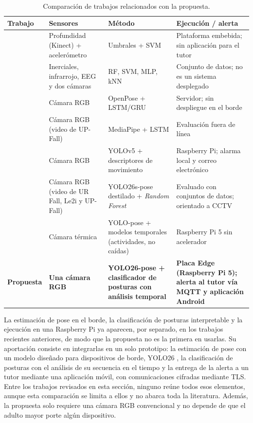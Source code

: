\documentclass[12pt,a4paper,oneside]{book}
\theoremstyle{plain}
\theoremstyle{definition}
\theoremstyle{remark}
\begin{document}
\begin{table}[htbp]
\centering
\caption{Comparación de trabajos relacionados con la propuesta.}
\label{tab:estado-arte}
\small
\begin{tabular}{L{2.6cm}L{2.8cm}L{3.0cm}L{3.4cm}}
\toprule
\textbf{Trabajo} & \textbf{Sensores} & \textbf{Método} & \textbf{Ejecución / alerta} \\
\midrule
\textcite{kwolek2014human} & Profundidad (Kinect) + acelerómetro & Umbrales + SVM & Plataforma embebida; sin aplicación para el tutor \\
\addlinespace
\textcite{martinez2019upfall} & Inerciales, infrarrojo, EEG y dos cámaras & RF, SVM, MLP, kNN & Conjunto de datos; no es un sistema desplegado \\
\addlinespace
\textcite{lin2021openpose} & Cámara RGB & OpenPose + LSTM/GRU & Servidor; sin despliegue en el borde \\
\addlinespace
\textcite{mobasheri2022fall} & Cámara RGB (video de UP-Fall) & MediaPipe + LSTM & Evaluación fuera de línea \\
\addlinespace
\textcite{giri2025yolov5pi} & Cámara RGB & YOLOv5 + descriptores de movimiento & Raspberry Pi; alarma local y correo electrónico \\
\addlinespace
\textcite{mukhtorov2026distilled} & Cámara RGB (video de UR Fall, Le2i y UP-Fall) & YOLO26s-pose destilado + \textit{Random Forest} & Evaluado con conjuntos de datos; orientado a CCTV \\
\addlinespace
\textcite{vdoviak2026thermal} & Cámara térmica & YOLO-pose + modelos temporales (actividades, no caídas) & Raspberry Pi 5 sin acelerador \\
\addlinespace
\textbf{Propuesta} & \textbf{Una cámara RGB} & \textbf{YOLO26-pose + clasificador de posturas con análisis temporal} & \textbf{Placa Edge (Raspberry Pi 5); alerta al tutor vía MQTT y aplicación Android} \\
\bottomrule
\end{tabular}
\end{table}
 
La estimación de pose en el borde, la clasificación de posturas interpretable y la ejecución en una Raspberry Pi ya aparecen, por separado, en los trabajos recientes anteriores, de modo que la propuesta no es la primera en usarlas. Su aportación consiste en integrarlas en un solo prototipo: la estimación de pose con un modelo diseñado para dispositivos de borde, YOLO26 \parencite{ultralytics2026yolo26}, la clasificación de posturas con el análisis de su secuencia en el tiempo y la entrega de la alerta a un tutor mediante una aplicación móvil, con comunicaciones cifradas mediante TLS. Entre los trabajos revisados en esta sección, ninguno reúne todos esos elementos, aunque esta comparación se limita a ellos y no abarca toda la literatura. Además, la propuesta solo requiere una cámara RGB convencional y no depende de que el adulto mayor porte algún dispositivo.
\end{document}
